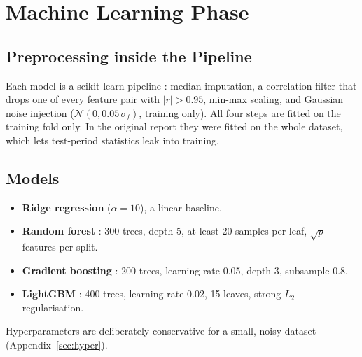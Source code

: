 \documentclass[12pt,a4paper,oneside]{report}
\begin{document}
\section{Machine Learning Phase}\label{sec:ml}
\subsection{Preprocessing inside the Pipeline}
Each model is a scikit-learn pipeline \citep{pedregosa2011scikit}: median
imputation, a correlation filter that drops one of every feature pair with
$|r|>0.95$, min-max scaling, and Gaussian noise injection
($\mathcal{N}(0, 0.05\,\sigma_f)$, training only). All four steps are fitted
on the training fold only. In the original report they were fitted on the
whole dataset, which lets test-period statistics leak into training.

\subsection{Models}
\begin{itemize}
  \item \textbf{Ridge regression} ($\alpha=10$), a linear baseline.
  \item \textbf{Random forest} \citep{breiman2001random}: 300 trees, depth
        5, at least 20 samples per leaf, $\sqrt{p}$ features per split.
  \item \textbf{Gradient boosting} \citep{friedman2001greedy}: 200 trees,
        learning rate 0.05, depth 3, subsample 0.8.
  \item \textbf{LightGBM} \citep{ke2017lightgbm}: 400 trees, learning rate
        0.02, 15 leaves, strong $L_2$ regularisation.
\end{itemize}
Hyperparameters are deliberately conservative for a small, noisy dataset
(Appendix~\ref{sec:hyper}).
\end{document}
